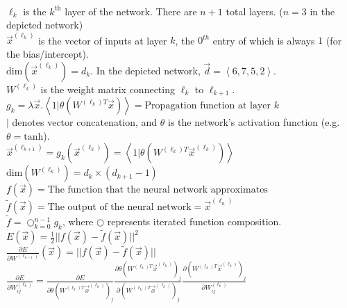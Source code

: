 \documentclass[10pt]{article}
\newcommand\norm[1]{{||}{#1}{||}}
\newcommand\vectorliteral[1]{\left<{#1}\right>}
\begin{document}
\\

\noindent
$\ell_k$ is the $k^\text{th}$ layer of the network. There are $n+1$ total layers. ($n=3$ in the depicted network)\\
$\vec{x}^{(\ell_k)}$ is the vector of inputs at layer $k$, the $0^{th}$ entry of which is always $1$ (for the bias/intercept).\\
$\text{dim}(\vec{x}^{(\ell_k)}) = d_k$. In the depicted network, $\vec{d} = \vectorliteral{6, 7, 5, 2}$.\\
$W^{(\ell_k)}$ is the weight matrix connecting $\ell_k$ to $\ell_{k+1}$.\\
$g_k = \lambda \vec{x}. \vectorliteral{1 | \theta(W^{(\ell_k)T}\vec{x})} = \text{Propagation function at layer $k$}$\\
$|$ denotes vector concatenation, and $\theta$ is the network's activation function (e.g. $\theta = \text{tanh}$).\\
$\vec{x}^{(\ell_{k+1})} = g_k(\vec{x}^{(\ell_k)}) = \vectorliteral{1 | \theta(W^{(\ell_k)T}\vec{x}^{(\ell_k)})}$\\
$\text{dim}(W^{(\ell_k)}) = d_k \times (d_{k+1}-1)$\\
$f(\vec{x}) = \text{The function that the neural network approximates}$\\
$\tilde{f}(\vec{x}) = \text{The output of the neural network} = \vec{x}^{(\ell_{n})}$\\
$\tilde{f} = \bigcirc_{k=0}^{n-1}g_k$, where $\bigcirc$ represents iterated function composition.\\
$E(\vec{x}) = \frac{1}{2}\norm{f(\vec{x}) - \tilde{f}(\vec{x})}^2$\\

\noindent
$\frac{\partial E}{\partial W^{(\ell_{n-1})}}(\vec{x}) = \norm{f(\vec{x}) - \tilde{f}(\vec{x})}$\\

\noindent
$\frac{\partial E}{\partial W_{ij}^{(\ell_k)}} =
    \frac{\partial E}{\partial \theta(W^{(\ell_k)T}\vec{x}^{(\ell_k)})_j}
    \frac{\partial \theta(W^{(\ell_k)T}\vec{x}^{(\ell_k)})_j}{\partial (W^{(\ell_k)T}\vec{x}^{(\ell_k)})_j}
    \frac{\partial (W^{(\ell_k)T}\vec{x}^{(\ell_k)})_j}{\partial W_{ij}^{(\ell_k)}}$\\
\end{document}
